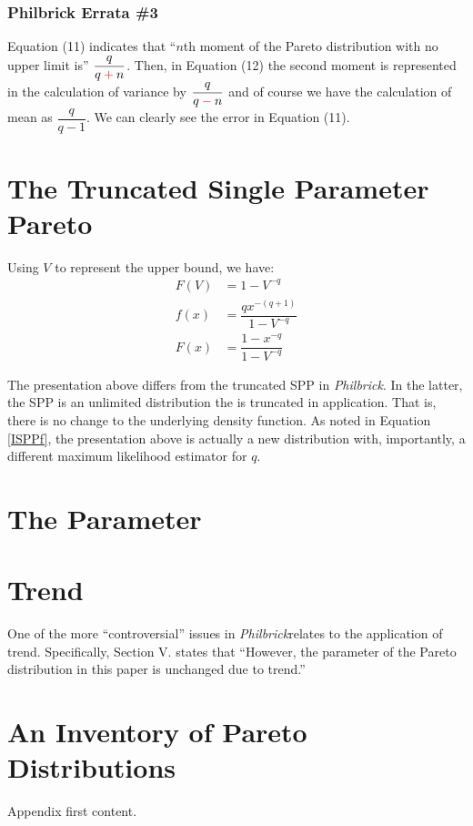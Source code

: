 \documentclass[]{article} %
\newcommand{\philbrick}{\textit{Philbrick}}
\begin{document}
\subsubsection{Philbrick Errata \#3}
Equation (11) indicates that ``$n$th moment of the Pareto distribution with no upper limit is'' $\dfrac{q}{q \color{red}+\color{black} n}$. Then, in Equation (12) the second moment is represented in the calculation of variance by $\dfrac{q}{q \color{red}-\color{black} n}$ and of course we have the calculation of mean as $\dfrac{q}{q - 1}$. We can clearly see the error in Equation (11).



\section{The Truncated Single Parameter Pareto}\label{sec:TSPP}
Using $V$ to represent the upper bound, we have:
\begin{align}
F(V) & = 1 - V^{-q}\\
f(x) & =  \dfrac{qx^{-(q+1)}}{1 - V^{-q}}\label{ISPPf}\\
F(x) & =  \dfrac{1 - x^{-q}}{1 - V^{-q}}\label{ISPPF}
\end{align}

The presentation above differs from the truncated SPP in \philbrick. In the latter, the SPP is an unlimited distribution the is truncated in application. That is, there is no change to the underlying density function. As noted in Equation \ref{ISPPf}, the presentation above is actually a new distribution with, importantly, a different maximum likelihood estimator for $q$.


\section{The Parameter}
\section{Trend}
One of the more ``controversial'' issues in \philbrick relates to the application of trend. Specifically, Section V. states that ``However, the parameter of the Pareto distribution in this paper is unchanged due to trend.''

\newpage
\appendix
\appendixpage

\section{An Inventory of Pareto Distributions}\label{ParetoInventory}
Appendix first content.
\end{document}
